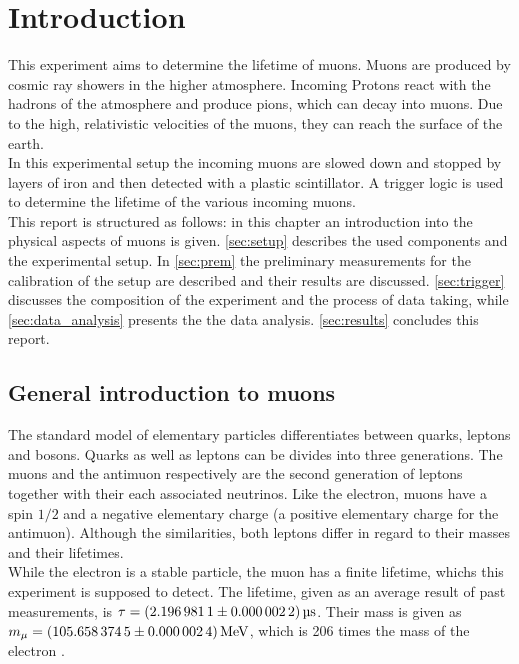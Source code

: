 \chapter{Introduction}
This experiment aims to determine the lifetime of muons. Muons are produced by cosmic ray showers 
in the higher atmosphere. Incoming Protons react with the hadrons of the atmosphere and produce 
pions, which can decay into muons. Due to the high, relativistic velocities of the muons, they can 
reach the surface of the earth. \\
In this experimental setup the incoming muons are slowed down and stopped
by layers of iron and then detected with a plastic scintillator. A trigger logic is used to determine 
the lifetime of the various incoming muons.\\
This report is structured as follows: in this chapter an introduction into the physical aspects of muons is given.
\autoref{sec:setup} describes the used components and the experimental setup. In \autoref{sec:prem}
the preliminary measurements for the calibration of the setup are described and their results are discussed. \autoref{sec:trigger} discusses
the composition of the experiment and the process of data taking, while \autoref{sec:data_analysis} 
presents the the data analysis. \autoref{sec:results} concludes this report.


\newpage
\section{General introduction to muons}
The standard model of elementary particles differentiates between quarks, leptons and bosons.
Quarks as well as leptons can be divides into three generations. The muons and the antimuon respectively 
are the second generation of leptons together with their each associated neutrinos. Like the electron,
muons have a spin $1/2$ and a negative elementary charge (a positive elementary charge for the antimuon).
Although the similarities, both leptons differ in regard to their masses and their lifetimes.\\
While the electron is a stable particle, the muon has a finite lifetime, whichs this experiment is supposed 
to detect. The lifetime, given as an average result of past measurements, is $\tau = \SI{2.1969811 \pm 0.0000022}{\micro\second}$.
Their mass is given as $m_{\mu} = \SI{105.6583745 \pm 0.0000024}{\mega\eV}$, which 
is 206 times the mass of the electron \cite{pdg}.
